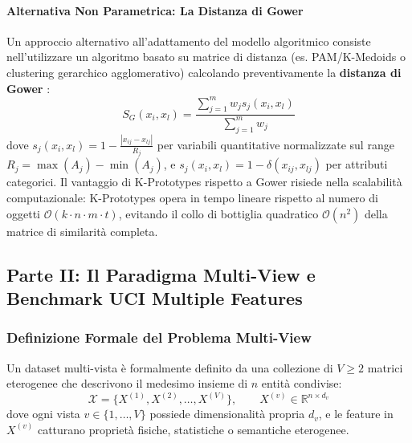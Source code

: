 \paragraph{Alternativa Non Parametrica: La Distanza di Gower}
Un approccio alternativo all'adattamento del modello algoritmico consiste nell'utilizzare un algoritmo basato su matrice di distanza (es. PAM/K-Medoids o clustering gerarchico agglomerativo) calcolando preventivamente la \textbf{distanza di Gower} \cite{gower1971}:
\begin{equation}
    S_{G}(x_i, x_l) = \frac{\sum_{j=1}^m w_j s_{j}(x_i, x_l)}{\sum_{j=1}^m w_j}
\end{equation}
dove $s_j(x_i, x_l) = 1 - \frac{|x_{ij} - x_{lj}|}{R_j}$ per variabili quantitative normalizzate sul range $R_j = \max(A_j) - \min(A_j)$, e $s_j(x_i, x_l) = 1 - \delta(x_{ij}, x_{lj})$ per attributi categorici. Il vantaggio di K-Prototypes rispetto a Gower risiede nella scalabilità computazionale: K-Prototypes opera in tempo lineare rispetto al numero di oggetti $\mathcal{O}(k \cdot n \cdot m \cdot t)$, evitando il collo di bottiglia quadratico $\mathcal{O}(n^2)$ della matrice di similarità completa.

\FloatBarrier
\subsection{Parte II: Il Paradigma Multi-View e Benchmark UCI Multiple Features}
\label{sec:lab-multiview-data}

\FloatBarrier
\subsubsection{Definizione Formale del Problema Multi-View}
\label{subsec:lab-mv-definition}

\begin{definition}
Un dataset multi-vista è formalmente definito da una collezione di $V \ge 2$ matrici eterogenee che descrivono il medesimo insieme di $n$ entità condivise:
\begin{equation}
    \mathcal{X} = \big\{ X^{(1)}, X^{(2)}, \dots, X^{(V)} \big\}, \qquad X^{(v)} \in \mathbb{R}^{n \times d_v}
\end{equation}
dove ogni vista $v \in \{1, \dots, V\}$ possiede dimensionalità propria $d_v$, e le feature in $X^{(v)}$ catturano proprietà fisiche, statistiche o semantiche eterogenee.
\end{definition}

